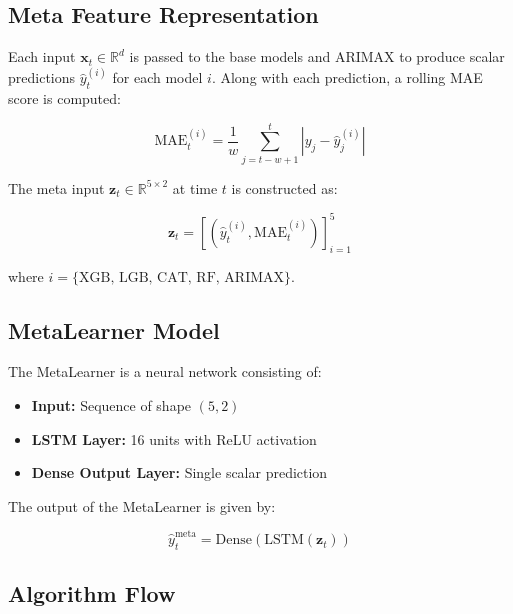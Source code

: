 \subsection{Meta Feature Representation}

Each input $\mathbf{x}_t \in \mathbb{R}^{d}$ is passed to the base models and ARIMAX to produce scalar predictions $\hat{y}_{t}^{(i)}$ for each model $i$. Along with each prediction, a rolling MAE score is computed:

\begin{equation}
\text{MAE}_{t}^{(i)} = \frac{1}{w} \sum_{j=t-w+1}^{t} \left| y_j - \hat{y}_j^{(i)} \right|
\end{equation}

The meta input $\mathbf{z}_t \in \mathbb{R}^{5 \times 2}$ at time $t$ is constructed as:

\begin{equation}
\mathbf{z}_t = \left[ \left( \hat{y}_t^{(i)}, \text{MAE}_t^{(i)} \right) \right]_{i=1}^5
\end{equation}

where $i = \{ \text{XGB, LGB, CAT, RF, ARIMAX} \}$.

\subsection{MetaLearner Model}

The MetaLearner is a neural network consisting of:
\begin{itemize}
    \item \textbf{Input:} Sequence of shape $(5, 2)$
    \item \textbf{LSTM Layer:} 16 units with ReLU activation
    \item \textbf{Dense Output Layer:} Single scalar prediction
\end{itemize}

The output of the MetaLearner is given by:

\begin{equation}
\hat{y}_t^{\text{meta}} = \text{Dense} \left( \text{LSTM}(\mathbf{z}_t) \right)
\end{equation}

\subsection{Algorithm Flow}

